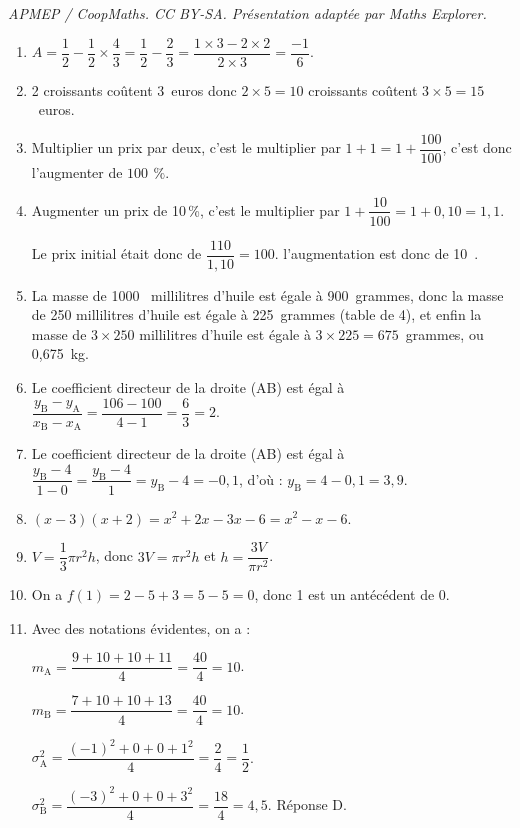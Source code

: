 \documentclass[10pt]{article}
\providecommand{\euro}{\texteuro}
\providecommand{\np}[2][]{{#2~#1}}
\providecommand{\euro}{{\text{€}}}
\renewcommand{\euro}{\ifmmode\text{\texteuro}\else\texteuro\fi}
\begin{document}
\noindent\textit{APMEP / CoopMaths. CC BY-SA. Présentation adaptée par Maths Explorer.}\par\medskip
\begin{enumerate}
\item $A = \dfrac 12 - \dfrac 12 \times \dfrac 43 = \dfrac 12 - \dfrac23 = \dfrac{1 \times 3 - 2 \times 2}{2 \times 3} = \dfrac{-1}{6}$.
\item 2 croissants coûtent 3~euros donc $2 \times 5 = 10$ croissants coûtent $3  \times 5 = 15$~euros.
\item Multiplier un prix par deux, c'est le multiplier par $1 + 1 = 1 + \dfrac{100}{100}$, c'est donc l'augmenter de $100~\,\%$.
\item Augmenter un prix de 10\,\%, c'est le multiplier par $1 + \dfrac{10}{100} = 1 + 0,10 = 1,1$.

Le prix initial était donc de $\dfrac{110}{1,10} = 100$. l'augmentation est donc de 10~\euro.
\item La masse de \np{1000} millilitres d'huile est égale à 900~grammes, donc la masse de 250  millilitres d'huile est égale à 225~grammes (table de 4), et enfin la masse de $3 \times 250$ millilitres d'huile est égale à $3 \times 225 = 675$~grammes, ou 0,675~kg.
\item Le coefficient directeur de la droite (AB) est égal à $\dfrac{y_{\text{B}} - y_{\text{A}}}{x_{\text{B}} - x_{\text{A}}} = \dfrac{106 - 100 }{4 - 1} = \dfrac 63 = 2$.
\item Le coefficient directeur de la droite (AB) est égal à $\dfrac{y_{\text{B}} - 4}{1 -  0} = \dfrac{y_{\text{B}} - 4}{1} = y_{\text{B}} - 4 = - 0,1$, d'où :
$y_{\text{B}} = 4 - 0,1 = 3,9$.
\item $(x - 3)(x + 2) = x^2  + 2x - 3x - 6 = x^2 - x - 6$.
\item $V = \dfrac 13 \pi r^2 h$, donc $3V = \pi r^2 h$ et $h = \dfrac{3V}{\pi r^2}$.
\item On a $f(1) = 2 - 5 + 3 = 5 - 5 = 0$, donc 1 est un antécédent de 0.
\item Avec des notations évidentes, on a :

$m_{\text{A}} = \dfrac{9 + 10 + 10 + 11}{4} = \dfrac{40}{4} = 10$.

$m_{\text{B}} = \dfrac{7 + 10 + 10 + 13}{4} = \dfrac{40}{4} = 10$.

$\sigma_{\text{A}}^2 = \dfrac{(- 1)^2 + 0 + 0 + 1^2}{4} = \dfrac{2}{4} = \dfrac12$.

$\sigma_{\text{B}}^2 = \dfrac{(- 3)^2  + 0 + 0 + 3^2}{4} = \dfrac{18}{4} = 4,5$. Réponse D.
\end{enumerate}

\medskip
\end{document}
